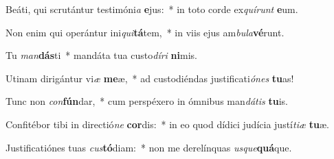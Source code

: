 \item Beáti, qui scrutántur testimóni\textit{a} \textbf{e}jus:~* in toto corde ex\textit{quí}\textit{runt} \textbf{e}um.
\item Non enim qui operántur ini\textit{qui}\textbf{tá}tem,~* in viis ejus am\textit{bu}\textit{la}\textbf{vé}runt.
\item Tu \textit{man}\textbf{dás}ti~* mandáta tua custo\textit{dí}\textit{ri} \textbf{ni}mis.
\item Utinam dirigántur vi\textit{æ} \textbf{me}æ,~* ad custodiéndas justificati\textit{ó}\textit{nes} \textbf{tu}as!
\item Tunc non \textit{con}\textbf{fún}dar,~* cum perspéxero in ómnibus man\textit{dá}\textit{tis} \textbf{tu}is.
\item Confitébor tibi in directió\textit{ne} \textbf{cor}dis:~* in eo quod dídici judícia justí\textit{ti}\textit{æ} \textbf{tu}æ.
\item Justificatiónes tuas \textit{cus}\textbf{tó}diam:~* non me derelínquas \textit{us}\textit{que}\textbf{quá}que.
